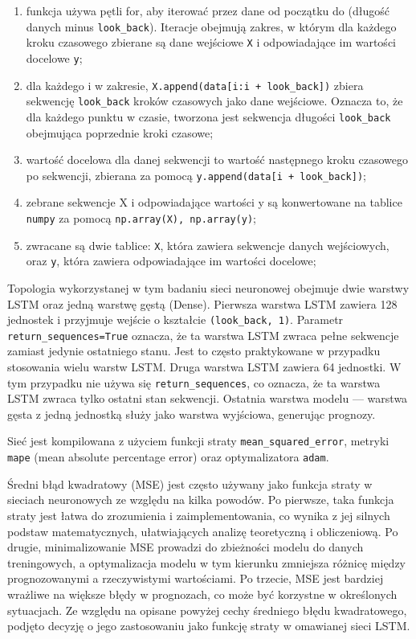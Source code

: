 \documentclass[polish, twoside, 12pt, a4paper]{article}
\theoremstyle{definition}
\theoremstyle{plain}
\theoremstyle{remark}
\newcommand{\code}[1]{\lstinline{#1}}
\begin{document}
\begin{enumerate}[label=\arabic*.]
	\item funkcja używa pętli for, aby iterować przez dane od początku do (długość danych minus \code{look_back}). Iteracje obejmują zakres, w którym dla każdego kroku czasowego zbierane są dane wejściowe \code{X} i odpowiadające im wartości docelowe \code{y};
	\item dla każdego i w zakresie, \code{X.append(data[i:i + look_back])} zbiera sekwencję \code{look_back} kroków czasowych jako dane wejściowe. Oznacza to, że dla każdego punktu w czasie, tworzona jest sekwencja długości \code{look_back} obejmująca poprzednie kroki czasowe;
	\item wartość docelowa dla danej sekwencji to wartość następnego kroku czasowego po sekwencji, zbierana za pomocą \code{y.append(data[i + look_back])};
	\item zebrane sekwencje X i odpowiadające wartości y są konwertowane na tablice \code{numpy} za pomocą \code{np.array(X), np.array(y)};
	\item zwracane są dwie tablice: \code{X}, która zawiera sekwencje danych wejściowych, oraz \code{y}, która zawiera odpowiadające im wartości docelowe;
\end{enumerate}

Topologia wykorzystanej w tym badaniu sieci neuronowej obejmuje dwie warstwy LSTM oraz jedną warstwę gęstą (Dense). Pierwsza warstwa LSTM zawiera 128 jednostek i przyjmuje wejście o kształcie \code{(look_back, 1)}. Parametr \code{return_sequences=True} oznacza, że ta warstwa LSTM zwraca pełne sekwencje zamiast jedynie ostatniego stanu. Jest to często praktykowane w przypadku stosowania wielu warstw LSTM. Druga warstwa LSTM zawiera 64 jednostki. W tym przypadku nie używa się \code{return_sequences}, co oznacza, że ta warstwa LSTM zwraca tylko ostatni stan sekwencji. Ostatnia warstwa modelu --- warstwa gęsta z jedną jednostką służy jako warstwa wyjściowa, generując prognozy.

Sieć jest kompilowana z użyciem funkcji straty \code{mean_squared_error}, metryki \code{mape} (mean absolute percentage error) oraz optymalizatora \code{adam}.

Średni błąd kwadratowy (MSE) jest często używany jako funkcja straty w sieciach neuronowych ze względu na kilka powodów. Po pierwsze, taka funkcja straty jest łatwa do zrozumienia i zaimplementowania, co wynika z jej silnych podstaw matematycznych, ułatwiających analizę teoretyczną i obliczeniową. Po drugie, minimalizowanie MSE prowadzi do zbieżności modelu do danych treningowych, a optymalizacja modelu w tym kierunku zmniejsza różnicę między prognozowanymi a rzeczywistymi wartościami. Po trzecie, MSE jest bardziej wrażliwe na większe błędy w prognozach, co może być korzystne w określonych sytuacjach. Ze względu na opisane powyżej cechy średniego błędu kwadratowego, podjęto decyzję o jego zastosowaniu jako funkcję straty w omawianej sieci LSTM.
\end{document}
